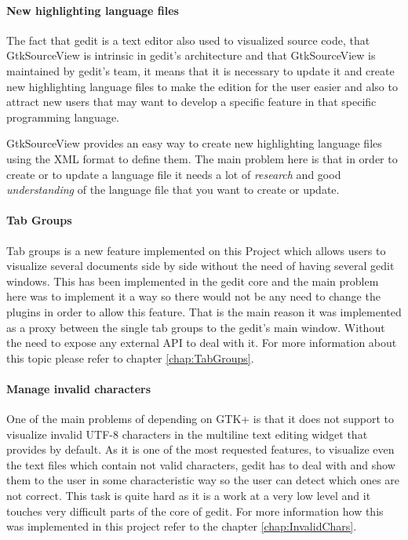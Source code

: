 \paragraph{New highlighting language files}

The fact that gedit is a text editor also used to visualized source code, that
GtkSourceView is intrinsic in gedit's architecture and that GtkSourceView is 
maintained by gedit's team, it means that it is necessary to update it and 
create new highlighting language files to make the edition for the user easier 
and also to attract new users that may want to develop a specific feature in 
that specific programming language.

GtkSourceView provides an easy way to create new highlighting language files 
using the XML format to define them. The main problem here is that in order to 
create or to update a language file it needs a lot of \emph{research} and good 
\emph{understanding} of the language file that you want to create or update.

\paragraph{Tab Groups}

Tab groups is a new feature implemented on this Project which allows users to
visualize several documents side by side without the need of having several
gedit windows. This has been implemented in the gedit core and the main problem
here was to implement it a way so there would not be any need to change the plugins
in order to allow this feature.
That is the main reason it was implemented as a proxy between the single tab groups
to the gedit's main window. Without the need to expose any external API to deal
with it. For more information about this topic please refer to chapter \ref{chap:TabGroups}.

\paragraph{Manage invalid characters}

One of the main problems of depending on GTK+ is that it does not support to 
visualize invalid UTF-8 characters in the multiline text editing widget that provides
by default. As it is one of the most requested features, to visualize even the 
text files which contain not valid characters, gedit has to deal with and show 
them to the user in some characteristic way so the user can detect which ones 
are not correct. This task is quite hard as it is a work at a very low level 
and it touches very difficult parts of the core of gedit. For more information 
how this was implemented in this project refer to the chapter \ref{chap:InvalidChars}.

